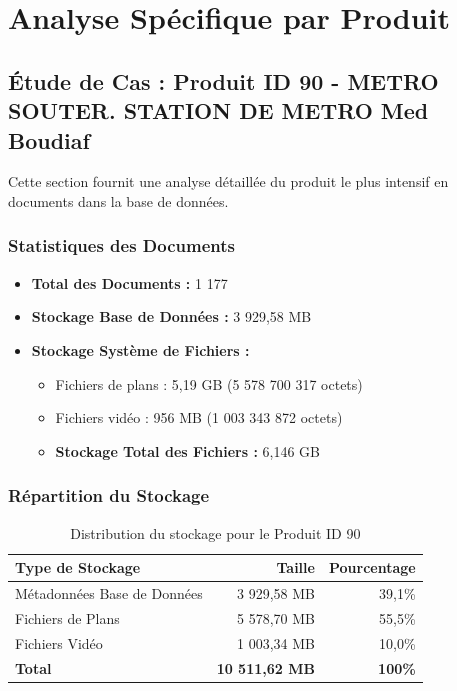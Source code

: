 \documentclass[12pt,a4paper]{article}
\begin{document}
\section{Analyse Spécifique par Produit}

\subsection{Étude de Cas : Produit ID 90 - METRO SOUTER. STATION DE METRO Med Boudiaf}

Cette section fournit une analyse détaillée du produit le plus intensif en documents dans la base de données.

\subsubsection{Statistiques des Documents}
\begin{itemize}
    \item \textbf{Total des Documents :} 1 177
    \item \textbf{Stockage Base de Données :} 3 929,58 MB
    \item \textbf{Stockage Système de Fichiers :}
    \begin{itemize}
        \item Fichiers de plans : 5,19 GB (5 578 700 317 octets)
        \item Fichiers vidéo : 956 MB (1 003 343 872 octets)
        \item \textbf{Stockage Total des Fichiers :} 6,146 GB
    \end{itemize}
\end{itemize}

\subsubsection{Répartition du Stockage}
\begin{table}[h]
\centering
\begin{tabular}{|l|r|r|}
\hline
\textbf{Type de Stockage} & \textbf{Taille} & \textbf{Pourcentage} \\
\hline
Métadonnées Base de Données & 3 929,58 MB & 39,1\% \\
Fichiers de Plans & 5 578,70 MB & 55,5\% \\
Fichiers Vidéo & 1 003,34 MB & 10,0\% \\
\hline
\textbf{Total} & \textbf{10 511,62 MB} & \textbf{100\%} \\
\hline
\end{tabular}
\caption{Distribution du stockage pour le Produit ID 90}
\end{table}
\end{document}
